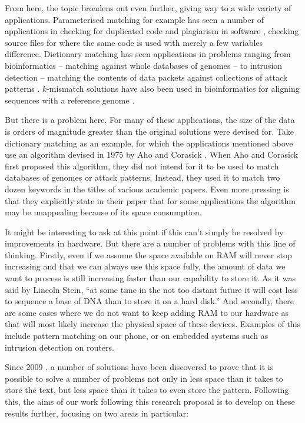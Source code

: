 \documentclass[a4paper,11pt]{article}
\begin{document}
    From here, the topic broadens out even further, giving way to a wide variety of applications. Parameterised matching for example has seen a number of applications in checking for duplicated code \cite{Baker:1993:TPP:167088.167115} and plagiarism in software \cite{Pandey:plagiarism}, checking source files for where the same code is used with merely a few variables difference. Dictionary matching has seen applications in problems ranging from bioinformatics -- matching against whole databases of genomes \cite{15713233} -- to intrusion detection -- matching the contents of data packets against collections of attack patterns \cite{1354682} \cite{website:snort-algo}. $k$-mismatch solutions have also been used in bioinformatics for aligning sequences with a reference genome \cite{Tennakoon10062012}.

    But there is a problem here. For many of these applications, the size of the data is orders of magnitude greater than the original solutions were devised for. Take dictionary matching as an example, for which the applications mentioned above use an algorithm devised in 1975 by Aho and Corasick \cite{Aho:1975:ESM:360825.360855}. When Aho and Corasick first proposed this algorithm, they did not intend for it to be used to match databases of genomes or attack patterns. Instead, they used it to match two dozen keywords in the titles of various academic papers. Even more pressing is that they explicitly state in their paper that for some applications the algorithm may be unappealing because of its space consumption.

    It might be interesting to ask at this point if this can't simply be resolved by improvements in hardware. But there are a number of problems with this line of thinking. Firstly, even if we assume the space available on RAM will never stop increasing and that we can always use this space fully, the amount of data we want to process is still increasing faster than our capability to store it. As it was said by Lincoln Stein, ``at some time in the not too distant future it will cost less to sequence a base of DNA than to store it on a hard disk.'' \cite{20441614} And secondly, there are some cases where we do not want to keep adding RAM to our hardware as that will most likely increase the physical space of these devices. Examples of this include pattern matching on our phone, or on embedded systems such as intrusion detection on routers.

    Since 2009 \cite{5438620}, a number of solutions have been discovered to prove that it is possible to solve a number of problems not only in less space than it takes to store the text, but less space than it takes to even store the pattern. Following this, the aims of our work following this research proposal is to develop on these results further, focusing on two areas in particular:
\end{document}
